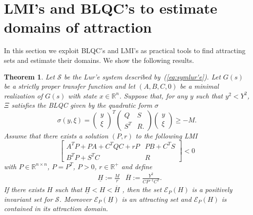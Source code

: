 \documentclass[letterpaper,10pt,twocolumn,journal,final]{IEEEtran}
\newtheorem{thm}{Theorem}[section]
\newcommand{\Csi}{\Xi}
\newcommand{\Real}{\mathbb{R}}
\newcommand{\ellips}{\mathcal{E}}
\begin{document}
\section{LMI's and BLQC's to estimate domains of attraction}\label{sec:LMI'n'IQC}
In this section we exploit BLQC's and LMI's as practical tools to find attracting sets and estimate their domains.
We show the following results.
\begin{thm}\label{thm:contracting ellipsoidal shell}
	Let $\mathcal{S}$ be the Lur'e system described by~(\ref{eq:symlur'e}). Let $G(s)$ be a strictly proper transfer function and let $(A,B,C,0)$ be
	a minimal realization of $G(s)$ with state $x \in \Real^{n}$.
	Suppose that, for any $y$ such that $y^2<Y^2$, $\Csi$ satisfies the BLQC given by the quadratic form $\sigma$
	\begin{equation}
		\sigma(y,\xi)=
			\left(
				\begin{array}{c}
					y \\
					\xi
				\end{array}
			\right)^T
			\left(
				\begin{array}{cc}
					Q	& S \\
					S^T	& R.
				\end{array}
			\right)
			\left(
				\begin{array}{c}
					y \\
					\xi
				\end{array}
			\right)
			\geq -M.
	\end{equation}
	Assume that there exists a solution $(P, r)$ to the following LMI
	\begin{equation}
		\left[
			\begin{array}{cc}
				A^TP+PA+C^TQC+rP	& PB+C^TS \\
				B^TP+S^TC		& R
			\end{array}
		\right] < 0
	\end{equation}
	with $P\in \Real^{n\times n}$, $P=P^T$, $P>0$, $r \in \Real^+$ and define
	\begin{align}
		& \underline{H} := \frac{M}{r}
		& \overline{H} := \frac{Y^2}{C P^{-1} C^T}.
	\end{align}
	If there exists $H$ such that $\underline H < H < \overline H$ , then  the set $\ellips_P(H)$ is a positively invariant set for $\mathcal{S}$. Moreover $\ellips_P(\underline H)$ is an attracting set and $\ellips_P(H)$ is contained in its attraction domain.
\end{thm}
\end{document}
